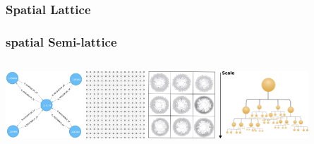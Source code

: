 \documentclass{beamer}
\begin{document}
\subsubsection{Spatial Lattice}
\begin{frame}
\frametitle{spatial Semi-lattice }
\begin{columns}[t]
		\centering		
		\includegraphics[width=0.6\columnwidth,height=2.5cm]{cell_neighbours.png}
        \centering
        \includegraphics[width=0.6\columnwidth,height=2.5cm]{gridtest1.png}
		\centering        
        \includegraphics[width=0.6\columnwidth,height=2.5cm]{griddedtaxonomy.png}
		\centering        
        \includegraphics[width=0.6\columnwidth,height=2.5cm]{quadtree.png}
\end{columns}						
	\end{frame}	
\end{document}
